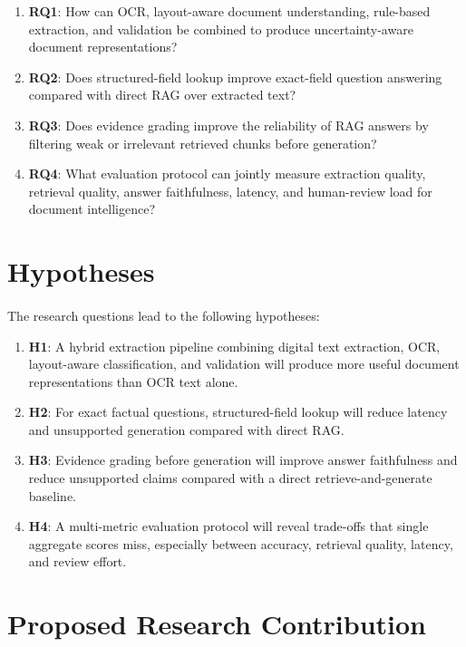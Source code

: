 \begin{enumerate}
    \item \textbf{RQ1}: How can OCR, layout-aware document understanding, rule-based extraction, and validation be combined to produce uncertainty-aware document representations?
    \item \textbf{RQ2}: Does structured-field lookup improve exact-field question answering compared with direct RAG over extracted text?
    \item \textbf{RQ3}: Does evidence grading improve the reliability of RAG answers by filtering weak or irrelevant retrieved chunks before generation?
    \item \textbf{RQ4}: What evaluation protocol can jointly measure extraction quality, retrieval quality, answer faithfulness, latency, and human-review load for document intelligence?
\end{enumerate}

\section{Hypotheses}
\paragraph{} The research questions lead to the following hypotheses:

\begin{enumerate}
    \item \textbf{H1}: A hybrid extraction pipeline combining digital text extraction, OCR, layout-aware classification, and validation will produce more useful document representations than OCR text alone.
    \item \textbf{H2}: For exact factual questions, structured-field lookup will reduce latency and unsupported generation compared with direct RAG.
    \item \textbf{H3}: Evidence grading before generation will improve answer faithfulness and reduce unsupported claims compared with a direct retrieve-and-generate baseline.
    \item \textbf{H4}: A multi-metric evaluation protocol will reveal trade-offs that single aggregate scores miss, especially between accuracy, retrieval quality, latency, and review effort.
\end{enumerate}

\section{Proposed Research Contribution}
